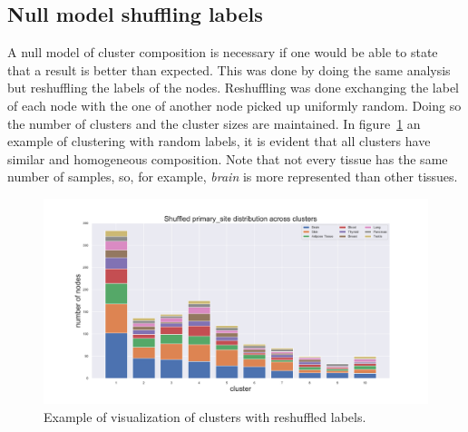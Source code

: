 \subsection{Null model shuffling labels}
A null model of cluster composition is necessary if one would be able to state that a result is better than expected. This was done by doing the same analysis but reshuffling the labels of the nodes. Reshuffling was done exchanging the label of each node with the one of another node picked up uniformly random. Doing so the number of clusters and the cluster sizes are maintained. In figure~\ref{fig:topic/gtex/oversigma_10tissue/shuffledclustercomposition_l3_primary_site} an example of clustering with random labels, it is evident that all clusters have similar and homogeneous composition. Note that not every tissue has the same number of samples, so, for example, \textit{brain} is more represented than other tissues.
\begin{figure}[htb!]
	\centering
	\includegraphics[width=0.85\linewidth]{pictures/topic/gtex/oversigma_10tissue/shuffledclustercomposition_l3_primary_site}
	\caption{Example of visualization of clusters with reshuffled labels.}
	\label{fig:topic/gtex/oversigma_10tissue/shuffledclustercomposition_l3_primary_site}
\end{figure}

